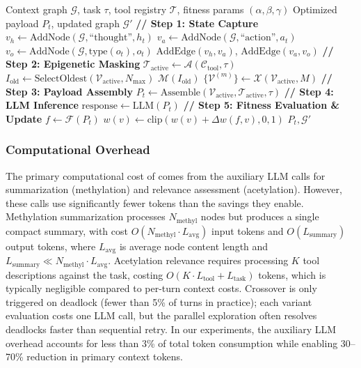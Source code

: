 \begin{algorithm}[t]
\caption{\EpiContext{} Per-Turn Execution Pipeline}
\label{alg:pipeline}
\begin{algorithmic}[1]
\REQUIRE Context graph $\mathcal{G}$, task $\tau$, tool registry $\mathcal{T}$, fitness params $(\alpha, \beta, \gamma)$
\ENSURE Optimized payload $P_t$, updated graph $\mathcal{G}'$
\STATE \textbf{// Step 1: State Capture}
\STATE $v_h \leftarrow \text{AddNode}(\mathcal{G}, \text{``thought''}, h_t)$
\STATE $v_a \leftarrow \text{AddNode}(\mathcal{G}, \text{``action''}, a_t)$
\STATE $v_o \leftarrow \text{AddNode}(\mathcal{G}, \text{type}(o_t), o_t)$
\STATE $\text{AddEdge}(v_h, v_a)$, $\text{AddEdge}(v_a, v_o)$
\STATE \textbf{// Step 2: Epigenetic Masking}
\STATE $\mathcal{T}_{\text{active}} \leftarrow \mathcal{A}(\mathcal{C}_{\text{tool}}, \tau)$ 
    \STATE $I_{\text{old}} \leftarrow \text{SelectOldest}(\mathcal{V}_{\text{active}}, N_{\text{max}})$
    \STATE $\mathcal{M}(I_{\text{old}})$ 
\ENDIF
{}
    \STATE $\{\mathcal{V}^{(m)}\} \leftarrow \mathcal{X}(\mathcal{V}_{\text{active}}, M)$ 
\ENDIF
\STATE \textbf{// Step 3: Payload Assembly}
\STATE $P_t \leftarrow \text{Assemble}(\mathcal{V}_{\text{active}}, \mathcal{T}_{\text{active}}, \tau)$
\STATE \textbf{// Step 4: LLM Inference}
\STATE $\text{response} \leftarrow \text{LLM}(P_t)$ 
\STATE \textbf{// Step 5: Fitness Evaluation \& Update}
\STATE $f \leftarrow \mathcal{F}(P_t)$
    \STATE $w(v) \leftarrow \text{clip}(w(v) + \Delta w(f, v), 0, 1)$
\ENDFOR
\RETURN $P_t, \mathcal{G}'$
\end{algorithmic}
\end{algorithm}

\subsubsection{Computational Overhead}

The primary computational cost of \EpiContext{} comes from the auxiliary LLM calls for summarization (methylation) and relevance assessment (acetylation). However, these calls use significantly fewer tokens than the savings they enable. Methylation summarization processes $N_{\text{methyl}}$ nodes but produces a single compact summary, with cost $O(N_{\text{methyl}} \cdot L_{\text{avg}})$ input tokens and $O(L_{\text{summary}})$ output tokens, where $L_{\text{avg}}$ is average node content length and $L_{\text{summary}} \ll N_{\text{methyl}} \cdot L_{\text{avg}}$. Acetylation relevance requires processing $K$ tool descriptions against the task, costing $O(K \cdot L_{\text{tool}} + L_{\text{task}})$ tokens, which is typically negligible compared to per-turn context costs. Crossover is only triggered on deadlock (fewer than 5\% of turns in practice); each variant evaluation costs one LLM call, but the parallel exploration often resolves deadlocks faster than sequential retry. In our experiments, the auxiliary LLM overhead accounts for less than 3\% of total token consumption while enabling 30--70\% reduction in primary context tokens.

